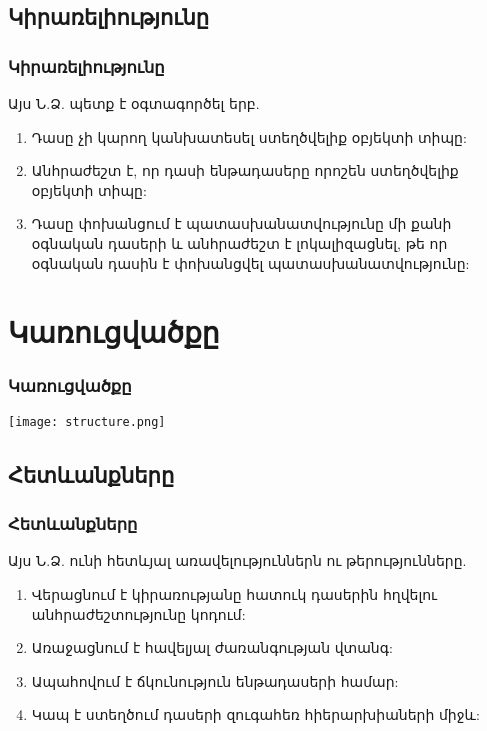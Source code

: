 \documentclass{beamer}
\begin{document}
\subsection{Կիրառելիությունը}
\begin{frame}\frametitle{Կիրառելիությունը}
Այս Ն.Ձ. պետք է օգտագործել երբ.
\vfill
\begin{enumerate}
    \item Դասը չի կարող կանխատեսել ստեղծվելիք օբյեկտի տիպը: \pause \vfill
    \item Անհրաժեշտ է, որ դասի ենթադասերը որոշեն ստեղծվելիք օբյեկտի տիպը: \pause \vfill
    \item Դասը փոխանցում է պատասխանատվությունը մի քանի օգնական դասերի և
     անհրաժեշտ է լոկալիզացնել, թե որ օգնական դասին է փոխանցվել պատասխանատվությունը:
\end{enumerate}
\end{frame}

\section{Կառուցվածքը}
\begin{frame}\frametitle{Կառուցվածքը}
\begin{center}
    \texttt{[image: structure.png]}
\end{center}
\end{frame}

\subsection{Հետևանքները}
\begin{frame}\frametitle{Հետևանքները}
Այս Ն.Ձ. ունի հետևյալ առավելություններն ու թերությունները.
\vfill
\begin{enumerate}
    \item Վերացնում է կիրառությանը հատուկ դասերին հղվելու անհրաժեշտությունը կոդում: \pause \vfill
    \item Առաջացնում է հավելյալ ժառանգության վտանգ: \pause \vfill
    \item Ապահովում է ճկունություն ենթադասերի համար: \pause \vfill
    \item Կապ է ստեղծում դասերի զուգահեռ հիերարխիաների միջև:
\end{enumerate}
\end{frame}
\end{document}
